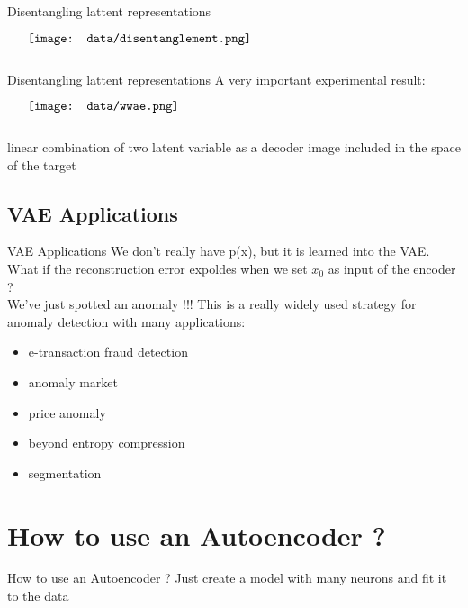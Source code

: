 \documentclass{beamer}
\begin{document}
\begin{frame}{Disentangling lattent representations}
    \begin{minipage}{5in}
    \centering
    $\vcenter{
    \texttt{[image: data/disentanglement.png]} \\
    }$
    \end{minipage}
\end{frame}


\begin{frame}{Disentangling lattent representations}
    A very important experimental result: \\
    \begin{minipage}{5in}
    \centering
    $\vcenter{
    \texttt{[image: data/wwae.png]} \\
    }$
    \end{minipage}
    linear combination of two latent variable as a decoder image included in the space of the target 
\end{frame}


\subsection{VAE Applications}
\begin{frame}{VAE Applications}
    We don't really have p(x), but it is learned into the VAE.\\
    What if the reconstruction error expoldes when we set $x_0$ as input of the encoder ? \\
    We've just spotted an anomaly !!!
    This is a really widely used strategy for anomaly detection with many applications:
    \begin{itemize}
        \item e-transaction fraud detection
        \item anomaly market
        \item price anomaly
	\item beyond entropy compression
	\item segmentation
    \end{itemize}
\end{frame} 

\section{How to use an Autoencoder ?}
\begin{frame}{How to use an Autoencoder ?}
    Just create a model with many neurons and fit it to the data
\end{frame}
\end{document}
